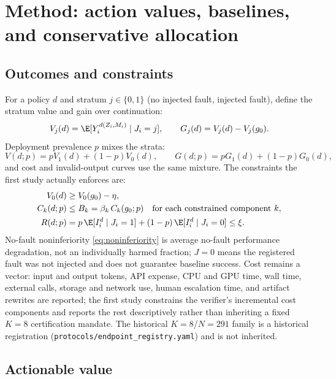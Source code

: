 \section{Method: action values, baselines, and conservative allocation}
\label{sec:policy}

\subsection{Outcomes and constraints}

For a policy $d$ and stratum $j\in\{0,1\}$ (no injected fault, injected fault),
define the stratum value and gain over continuation:
\begin{equation}
 V_j(d)=\E[Y_i^{d(Z_i,M_i)}\mid J_i=j],\qquad
 G_j(d)=V_j(d)-V_j(g_0).
 \label{eq:stratum-values}
\end{equation}
Deployment prevalence $p$ mixes the strata:
\begin{equation}
 V(d;p)=pV_1(d)+(1-p)V_0(d),\qquad
 G(d;p)=pG_1(d)+(1-p)G_0(d),
 \label{eq:prevalence-value}
\end{equation}
and cost and invalid-output curves use the same mixture.  The constraints the
first study actually enforces are:
\begin{align}
 V_0(d)&\ge V_0(g_0)-\eta, \label{eq:noninferiority}\\
 C_k(d;p)&\le B_k=\beta_k\,C_k(g_0;p)\quad\text{for each constrained component }k,
 \label{eq:cost-constraint}\\
 R(d;p)&=p\,\E[I_i^{d}\mid J_i=1]+(1-p)\,\E[I_i^{d}\mid J_i=0]\le\xi.
 \label{eq:invalid-constraint}
\end{align}
No-fault noninferiority \eqref{eq:noninferiority} is average no-fault
performance degradation, not an individually harmed fraction; $J=0$ means the
registered fault was not injected and does not guarantee baseline success.
Cost remains a vector: input and output tokens, API expense, CPU and GPU time,
wall time, external calls, storage and network use, human escalation time, and
artifact rewrites are reported; the first study constrains the verifier's
incremental cost components and reports the rest descriptively rather than
inheriting a fixed $K=8$ certification mandate.  The historical
$K=8$/$N=291$ family is a historical registration
(\texttt{protocols/endpoint\_registry.yaml}) and is not inherited.

\subsection{Actionable value}

